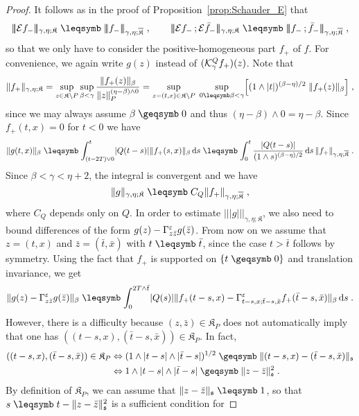 \documentclass[reqno,11pt]{article}
\def\normDgamma#1{|\!|\!|#1|\!|\!|}
\def\seminormff#1#2{|\!|\!|#1\,\mathord{;}\,#2|\!|\!|}
\def\fraks{\mathfrak{s}}
\def\fraK{\mathfrak{K}}
\def\fraKbar{\overline{\mathfrak{K}}}
\begin{document}
\begin{proof}
It follows as in the proof of Proposition~\ref{prop:Schauder_E} that 
\[
 \normDgamma{\cE f_-}_{\gamma,\eta;\fraK} \leqs
\normDgamma{f_-}_{\gamma,\eta;\fraKbar}\;, \qquad 
 \seminormff{\cE f_-}{\cE \bar f_-}_{\gamma,\eta;\fraK} \leqs 
 \seminormff{f_-}{\bar f_-}_{\gamma,\eta;\fraKbar}\;,
\]
so that we only have to consider the positive-homogeneous part $f_+$ of $f$. 
For convenience, we again write $g(z)$ instead of $({\mathcal K}^Q_\gamma f_+)(z)$. Note
that 
\[
 \norm{f_+}_{\gamma,\eta;\fraK} = \sup_{z\in\fraK\setminus P}
\sup_{\beta<\gamma} 
 \frac{\norm{f_+(z)}_\beta}{\norm{z}_P^{(\eta-\beta)\wedge 0}}
 = \sup_{z=(t,x)\in\fraK\setminus P} \; \sup_{0\leqs\beta<\gamma} \Bigbrak{
 (1\wedge\abs{t})^{(\beta-\eta)/2} \; \norm{f_+(z)}_\beta}\;,
\]
since we may always assume $\beta\geqs0$ and thus $(\eta-\beta)\wedge 0 =
\eta-\beta$. Since $f_+(t,x)=0$ for $t<0$ we have 
\[
 \norm{g(t,x)}_\beta 
\leqs \int_{(t-2T)\vee0}^t \abs{Q(t-s)} \norm{f_+(s,x)}_\beta \6s \\
\leqs \int_0^t \frac{\abs{Q(t-s)}}{(1\wedge s)^{(\beta-\eta)/2}} \6s \, 
\norm{f_+}_{\gamma,\eta;\fraKbar}\;.
\]
Since $\beta<\gamma<\eta+2$, the integral is convergent and we have 
\[
 \norm{g}_{\gamma,\eta;\fraK} \leqs C_Q
\norm{f_+}_{\gamma,\eta;\fraKbar}\;,
\]
where $C_Q$ depends only on $Q$. In order to estimate
$\normDgamma{g}_{\gamma,\eta;\fraK}$, we also need to bound differences of the
form $g(z)-\Gamma^\varepsilon_{z\bar z}g(\bar z)$. From now on we assume that $z=(t,x)$
and $\bar z=(\bar t,\bar x)$ with $t\leqs\bar t$, since the case $t>\bar t$
follows by symmetry. Using the fact that $f_+$ is supported on $\set{t\geqs0}$
and translation invariance, we get
\[
 \norm{g(z)-\Gamma^\eps_{z\bar z}g(\bar z)}_\beta 
\leqs \int_0^{2T\wedge\bar t} \abs{Q(s)} \norm{f_+(t-s,x)
-\Gamma^\eps_{t-s,x;\bar t-s,\bar x}f_+(\bar t-s,\bar x)}_\beta \6s\;.
\]
However, there is a difficulty because $(z,\bar z)\in\fraK_P$ does not
automatically imply that one has $((t-s,x),(\bar t-s,\bar x))\in\fraK_P$. In
fact, 
\begin{align*}
((t-s,x),(\bar t-s,\bar x))\in\fraK_P 
&\Leftrightarrow (1\wedge\abs{t-s}{}\wedge{}\abs{\bar t-s})^{1/2} \geqs
\norm{(t-s,x)-(\bar t-s,\bar x)}_\fraks \\
&\Leftrightarrow 1\wedge\abs{t-s}{}\wedge{}\abs{\bar t-s} \geqs
\norm{z-\bar z}^2_\fraks\;.
\end{align*}
By definition of $\fraK_P$, we can assume that $\norm{z-\bar z}_\fraks \leqs 1$,
so that $s\leqs t-\norm{z-\bar z}_\fraks^2$ is a sufficient condition for

\end{proof}
\end{document}
